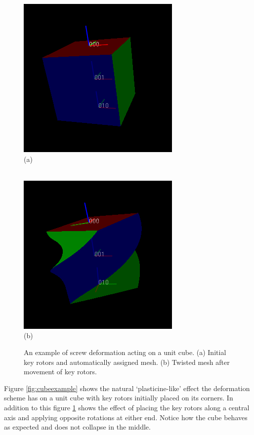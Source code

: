 \begin{figure}[p]
\centering
\includegraphics[height=0.37\textheight]{twist_cube_before} \\
\noindent (a) \\ \rule{0pt}{\parskip} \\
\includegraphics[height=0.37\textheight]{twist_cube_after} \\
\noindent (b) 
\caption{\label{fig:screwcubeexample}An example of screw deformation acting on a unit cube.
  (a) Initial key rotors and automatically assigned mesh. 
  (b) Twisted mesh after movement of key rotors.} 
\end{figure}

Figure \ref{fig:cubeexample} shows the natural `plasticine-like' effect the deformation
scheme has on a unit cube with key rotors initially placed on its corners. In addition to
this figure \ref{fig:screwcubeexample} shows the effect of placing the key rotors along
a central axis and applying opposite rotations at either end. Notice how the cube behaves as
expected and does not collapse in the middle.

